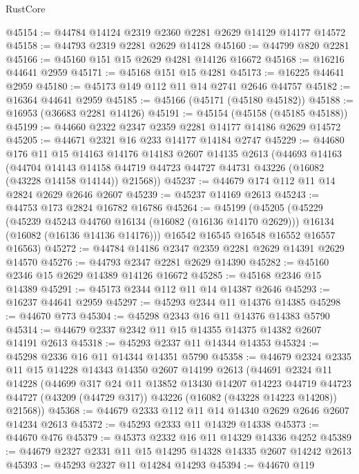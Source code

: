 \begin{lexlean}{RustCore}
\begin{coremodule}
@45154 := @44784 @14124 @2319 @2360 @2281 @2629 @14129 @14177 @14572
@45158 := @44793 @2319 @2281 @2629 @14128
@45160 := @44799 @820 @2281
@45166 := @45160 @151 @15 @2629 @4281 @14126 @16672
@45168 := @16216 @44641 @2959
@45171 := @45168 @151 @15 @4281
@45173 := @16225 @44641 @2959
@45180 := @45173 @149 @112 @11 @14 @2741 @2646 @44757
@45182 := @16364 @44641 @2959
@45185 := @45166 (@45171 (@45180 @45182))
@45188 := @16953 (@36683 @2281 @14126)
@45191 := @45154 (@45158 (@45185 @45188))
@45199 := @44660 @2322 @2347 @2359 @2281 @14177 @14186 @2629 @14572
@45205 := @44671 @2321 @16 @233 @14177 @14184 @2747
@45229 := @44680
    @176
    @11
    @15
    @14163
    @14176
    @14183
    @2607
    @14135
    @2613
    (@44693
      @14163
      (@44704
        @14143
        @14158
        @44719
        @44723
        @44727
        @44731
        @43226
        (@16082 (@43228 @14158 @14144))
        @21568))
@45237 := @44679 @174 @112 @11 @14 @2824 @2629 @2646 @2607
@45239 := @45237 @14169 @2613
@45243 := @44753 @173 @2824 @16782 @16786
@45264 := @45199
    (@45205
      (@45229
        (@45239 @45243 @44760 @16134 (@16082 (@16136 @14170 @2629)))
        @16134
        (@16082 (@16136 @14136 @14176)))
      @16542
      @16545
      @16548
      @16552
      @16557
      @16563)
@45272 := @44784 @14186 @2347 @2359 @2281 @2629 @14391 @2629 @14570
@45276 := @44793 @2347 @2281 @2629 @14390
@45282 := @45160 @2346 @15 @2629 @14389 @14126 @16672
@45285 := @45168 @2346 @15 @14389
@45291 := @45173 @2344 @112 @11 @14 @14387 @2646
@45293 := @16237 @44641 @2959
@45297 := @45293 @2344 @11 @14376 @14385
@45298 := @44670 @773
@45304 := @45298 @2343 @16 @11 @14376 @14383 @5790
@45314 := @44679 @2337 @2342 @11 @15 @14355 @14375 @14382 @2607 @14191 @2613
@45318 := @45293 @2337 @11 @14344 @14353
@45324 := @45298 @2336 @16 @11 @14344 @14351 @5790
@45358 := @44679
    @2324
    @2335
    @11
    @15
    @14228
    @14343
    @14350
    @2607
    @14199
    @2613
    (@44691
      @2324
      @11
      @14228
      (@44699
        @317
        @24
        @11
        @13852
        @13430
        @14207
        @14223
        @44719
        @44723
        @44727
        (@43209 (@44729 @317))
        @43226
        (@16082 (@43228 @14223 @14208))
        @21568))
@45368 := @44679 @2333 @112 @11 @14 @14340 @2629 @2646 @2607 @14234 @2613
@45372 := @45293 @2333 @11 @14329 @14338
@45373 := @44670 @476
@45379 := @45373 @2332 @16 @11 @14329 @14336 @4252
@45389 := @44679 @2327 @2331 @11 @15 @14295 @14328 @14335 @2607 @14242 @2613
@45393 := @45293 @2327 @11 @14284 @14293
@45394 := @44670 @119

\end{coremodule}
\end{lexlean}
